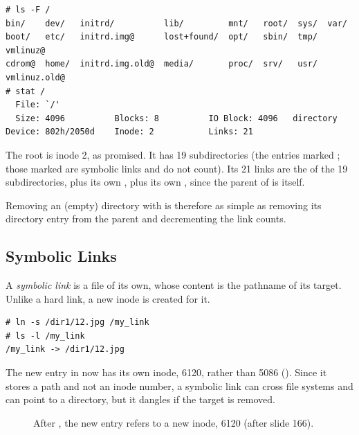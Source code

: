\begin{example}
\begin{lstlisting}[style=sh]
# ls -F /
bin/    dev/   initrd/          lib/         mnt/   root/  sys/  var/
boot/   etc/   initrd.img@      lost+found/  opt/   sbin/  tmp/  vmlinuz@
cdrom@  home/  initrd.img.old@  media/       proc/  srv/   usr/  vmlinuz.old@
# stat /
  File: `/'
  Size: 4096          Blocks: 8          IO Block: 4096   directory
Device: 802h/2050d    Inode: 2           Links: 21
\end{lstlisting}
  The root is inode 2, as promised. It has 19 subdirectories (the entries marked \code{/}; those marked  are symbolic links and do not count). Its 21 links are the  of the 19 subdirectories, plus its own , plus its own , since the parent of \code{/} is \code{/} itself.
\end{example}

Removing an (empty) directory with  is therefore as simple as removing its directory entry from the parent and decrementing the link counts.

\subsection{Symbolic Links}

\begin{definition}
  A \emph{symbolic link} is a file of its own, whose content is the pathname of its target. Unlike a hard link, a new inode is created for it.
\end{definition}

\begin{lstlisting}[style=sh]
# ln -s /dir1/12.jpg /my_link
# ls -l /my_link
/my_link -> /dir1/12.jpg
\end{lstlisting}
The new entry  in \code{/} now has its own inode, 6120, rather than 5086 (). Since it stores a path and not an inode number, a symbolic link can cross file systems and can point to a directory, but it dangles if the target is removed.

\begin{figure}[H]
\centering
\renewcommand{\extfont}{\scriptsize}\renewcommand{\extrowh}{0.45}
\caption{After , the new entry  refers to a new inode, 6120 (after slide 166).}
\label{fig:symlink}
\end{figure}

